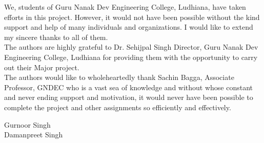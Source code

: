 \begin{Large}
\end{Large}

\noindent We, students of Guru Nanak Dev Engineering College, Ludhiana, have taken efforts in this project.
However, it would not have been possible without the kind support and help of many individuals
and organizations. I would like to extend my sincere thanks to all of them.\\

\noindent The authors are highly grateful to Dr. Sehijpal Singh Director, Guru Nanak Dev Engineering College, Ludhiana for providing them with the opportunity to carry out their Major project.\\

\noindent The authors would like to wholeheartedly thank Sachin Bagga, Associate Professor, GNDEC who is a vast sea of knowledge and without whose constant and never ending support and motivation, it would never have been possible to complete the project and other assignments so efficiently and effectively.

\vskip 1.0cm 
\noindent Gurnoor Singh\\
\noindent Damanpreet Singh